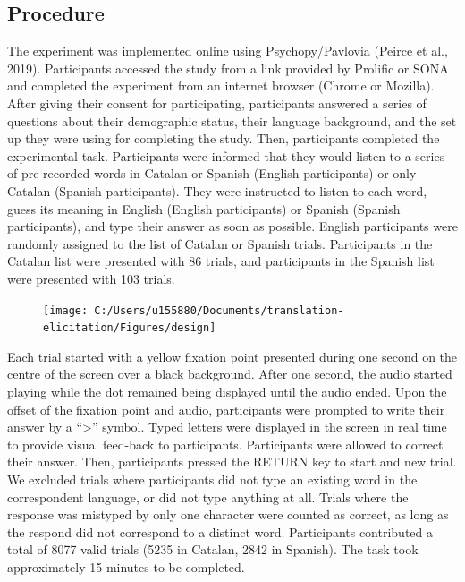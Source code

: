 \documentclass[
  english,
  man,floatsintext]{apa6}
\begin{document}
\hypertarget{procedure}{%
\subsection{Procedure}\label{procedure}}

The experiment was implemented online using Psychopy/Pavlovia (Peirce et al., 2019). Participants accessed the study from a link provided by Prolific or SONA and completed the experiment from an internet browser (Chrome or Mozilla). After giving their consent for participating, participants answered a series of questions about their demographic status, their language background, and the set up they were using for completing the study. Then, participants completed the experimental task. Participants were informed that they would listen to a series of pre-recorded words in Catalan or Spanish (English participants) or only Catalan (Spanish participants). They were instructed to listen to each word, guess its meaning in English (English participants) or Spanish (Spanish participants), and type their answer as soon as possible. English participants were randomly assigned to the list of Catalan or Spanish trials. Participants in the Catalan list were presented with 86 trials, and participants in the Spanish list were presented with 103 trials.

\begin{figure}
\texttt{[image: C:/Users/u155880/Documents/translation-elicitation/Figures/design]} \caption{ }\label{fig:procedurefigure}
\end{figure}

Each trial started with a yellow fixation point presented during one second on the centre of the screen over a black background. After one second, the audio started playing while the dot remained being displayed until the audio ended. Upon the offset of the fixation point and audio, participants were prompted to write their answer by a ``\textgreater{}'' symbol. Typed letters were displayed in the screen in real time to provide visual feed-back to participants. Participants were allowed to correct their answer. Then, participants pressed the RETURN key to start and new trial. We excluded trials where participants did not type an existing word in the correspondent language, or did not type anything at all. Trials where the response was mistyped by only one character were counted as correct, as long as the respond did not correspond to a distinct word. Participants contributed a total of 8077 valid trials (5235 in Catalan, 2842 in Spanish). The task took approximately 15 minutes to be completed.
\end{document}
